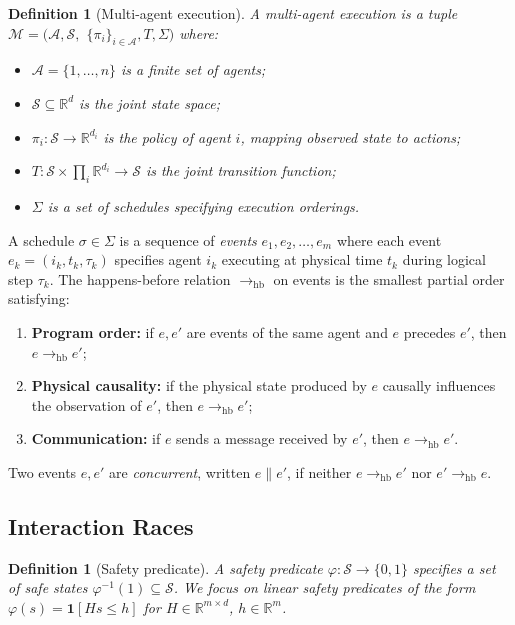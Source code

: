 \documentclass[11pt]{article}
\newtheorem{definition}[theorem]{Definition}
\newcommand{\R}{\mathbb{R}}
\newcommand{\calS}{\mathcal{S}}
\newcommand{\calA}{\mathcal{A}}
\newcommand{\calM}{\mathcal{M}}
\newcommand{\hb}{\rightarrow_{\mathrm{hb}}}
\newcommand{\conc}{\parallel}
\begin{document}
\begin{definition}[Multi-agent execution]
\label{def:execution}
A \emph{multi-agent execution} is a tuple $\calM = (\calA, \calS,$
$\{\pi_i\}_{i\in\calA}, T, \Sigma)$ where:
\begin{itemize}[nosep]
\item $\calA = \{1,\ldots,n\}$ is a finite set of agents;
\item $\calS \subseteq \R^d$ is the joint state space;
\item $\pi_i : \calS \to \R^{d_i}$ is the policy of agent $i$, mapping observed state to actions;
\item $T : \calS \times \prod_{i} \R^{d_i} \to \calS$ is the joint transition function;
\item $\Sigma$ is a set of \emph{schedules} specifying execution orderings.
\end{itemize}
\end{definition}

A schedule $\sigma \in \Sigma$ is a sequence of \emph{events}
$e_1, e_2, \ldots, e_m$ where each event $e_k = (i_k, t_k, \tau_k)$
specifies agent $i_k$ executing at physical time $t_k$ during logical
step $\tau_k$. The happens-before relation $\hb$ on events is the smallest
partial order satisfying:
\begin{enumerate}[nosep,label=(\roman*)]
\item \textbf{Program order:} if $e, e'$ are events of the same agent and
$e$ precedes $e'$, then $e \hb e'$;
\item \textbf{Physical causality:} if the physical state produced by $e$
causally influences the observation of $e'$, then $e \hb e'$;
\item \textbf{Communication:} if $e$ sends a message received by $e'$,
then $e \hb e'$.
\end{enumerate}

Two events $e, e'$ are \emph{concurrent}, written $e \conc e'$, if
neither $e \hb e'$ nor $e' \hb e$.

\subsection{Interaction Races}

\begin{definition}[Safety predicate]
A \emph{safety predicate} $\varphi : \calS \to \{0,1\}$ specifies a set
of safe states $\varphi^{-1}(1) \subseteq \calS$. We focus on
\emph{linear safety predicates} of the form $\varphi(s) = \mathbf{1}[Hs \leq h]$
for $H \in \R^{m \times d}$, $h \in \R^m$.
\end{definition}
\end{document}
